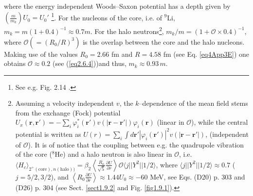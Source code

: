 where the energy independent Woods--Saxon potential has a depth given by\\\mbox{$\left(\frac{m}{m_k}\right)U_0=U_0'$} \footnote{See e.g. Fig. 2.14 \cite{Mahaux:85}.}. For the nucleons of the core, i.e. of $^9$Li, $m_k=m(1+0.4)^{-1}\approx 0.7 m$. For the halo neutrons\footnote{Assuming a velocity independent $v$, the $k$--dependence of the mean field stems from the exchange (Fock)  potential $U_x(\mathbf r, \mathbf r')=-\sum_i\varphi^*_i(\mathbf r')v(|\mathbf r-\mathbf r'|)\varphi_i(\mathbf r)$ (linear in $\mathcal O$), while the central potential is written as $U(r)=\sum_i\int d\mathbf r' |\varphi_i(\mathbf r')|^2v(|\mathbf r- \mathbf r'|)$, (independent of $\mathcal O$). It is of notice that the coupling between e.g. the quadrupole vibration of the core ($^8$He) and a halo neutron is also linear in $\mathcal O$, i.e. $\langle H_c\rangle_{2^+(\text{core}),n (\text{halo}))}=\beta_2\left\langle\frac{R_0}{\sqrt{5}}\frac{\partial U}{\partial r}\right\rangle\mathcal O\langle j||Y^2||1/2\rangle$, where $\langle j||Y^2||1/2\rangle\approx0.7$ ($j=5/2,3/2$), and $\left\langle R_0\frac{\partial U}{\partial r}\right\rangle\approx1.44 U_0\approx -60$ MeV, see \cite{Brink:05} Eqs. (D20) p. 303 and (D26) p. 304 (see Sect. \ref{sect1.9.2} and Fig. \ref{fig1.9.1}).}, $m_k/m=(1+\mathcal O\times0.4)^{-1}$, where $\mathcal O(=(R_0/R)^3)$ is the overlap between the core and the halo nucleons. Making use of the values $R_0=2.66$ fm and $R=4.58$ fm (see Eq. \ref{eq4App3E})  one obtains $\mathcal O\approx0.2$ (see (\ref{eq2.6.4}))and thus,  $m_k\approx 0.93 \,m$.
